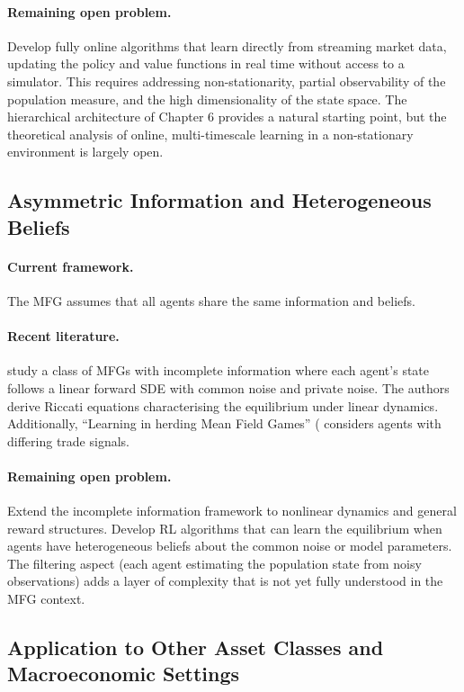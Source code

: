 \paragraph{Remaining open problem.} Develop fully online algorithms that learn
directly from streaming market data, updating the policy and value functions in
real time without access to a simulator. This requires addressing
non-stationarity, partial observability of the population measure, and the high
dimensionality of the state space. The hierarchical architecture of Chapter 6
provides a natural starting point, but the theoretical analysis of online,
multi-timescale learning in a non-stationary environment is largely open.

\subsection{Asymmetric Information and Heterogeneous Beliefs}

\paragraph{Current framework.} The MFG assumes that all agents share the same
information and beliefs.

\paragraph{Recent literature.} \citet{incompleteinfomfg2024} study a class of MFGs with incomplete information where each
agent's state follows a linear forward SDE with common noise and private noise.
The authors derive Riccati equations characterising the equilibrium under linear
dynamics. Additionally, ``Learning in herding Mean Field Games'' (\citep{zengetal2024} considers agents with differing trade signals.

\paragraph{Remaining open problem.} Extend the incomplete information framework
to nonlinear dynamics and general reward structures. Develop RL algorithms that
can learn the equilibrium when agents have heterogeneous beliefs about the common
noise or model parameters. The filtering aspect (each agent estimating the
population state from noisy observations) adds a layer of complexity that is not
yet fully understood in the MFG context.

\subsection{Application to Other Asset Classes and Macroeconomic Settings}

